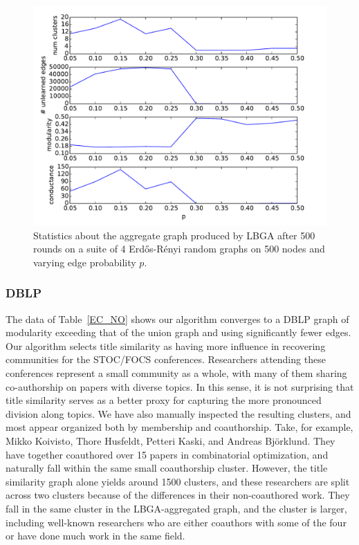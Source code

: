 \documentclass{IEEEtran}
\newcommand{\er}{Erd\H{o}s-R\'{e}nyi }
\begin{document}
\begin{figure}[t]
\begin{centering}
\includegraphics[width=\columnwidth]{figures/er-consistentNO-varying-p.pdf}
\par\end{centering}
\caption{Statistics about the aggregate graph produced by LBGA after 500 rounds
on a suite of 4 \er random graphs on 500 nodes and varying edge probability
$p$.} 
\label{fig:erpvaries}
\end{figure}

\subsubsection{DBLP}
The data of Table~\ref{EC_NO} shows our algorithm converges to a DBLP graph of
modularity exceeding that of the union graph and using significantly fewer
edges. Our algorithm selects title similarity as having more influence in
recovering communities for the STOC/FOCS conferences. Researchers attending
these conferences represent a small community as a whole, with many of them
sharing co-authorship on papers with diverse topics. In this sense, it is not
surprising that title similarity serves as a better proxy for capturing the
more pronounced division along topics. We have also manually inspected the
resulting clusters, and most appear organized both by membership and
coauthorship. Take, for example, Mikko Koivisto, Thore Husfeldt, Petteri Kaski,
and Andreas Bj\"{o}rklund. They have together coauthored over 15 papers in
combinatorial optimization, and naturally fall within the same small
coauthorship cluster. However, the title similarity graph alone yields around
1500 clusters, and these researchers are split across two clusters because of
the differences in their non-coauthored work. They fall in the same cluster in
the LBGA-aggregated graph, and the cluster is larger, including well-known
researchers who are either coauthors with some of the four or have done much
work in the same field. 
\end{document}

